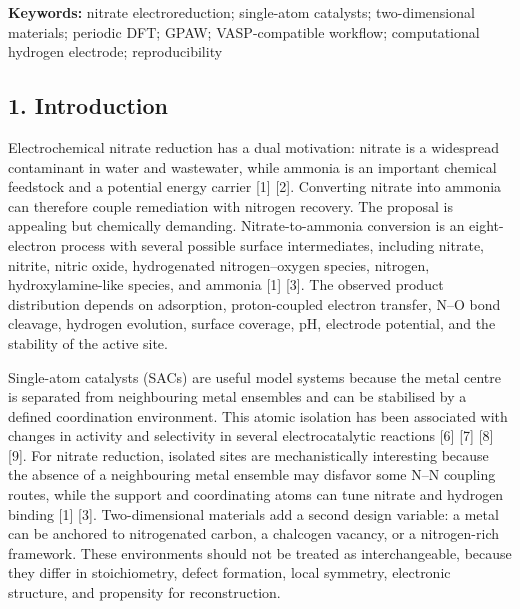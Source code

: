 \documentclass[
]{article}
\begin{document}
\textbf{Keywords:} nitrate electroreduction; single-atom catalysts;
two-dimensional materials; periodic DFT; GPAW; VASP-compatible workflow;
computational hydrogen electrode; reproducibility

\hypertarget{introduction}{%
\subsection{1. Introduction}\label{introduction}}

Electrochemical nitrate reduction has a dual motivation: nitrate is a
widespread contaminant in water and wastewater, while ammonia is an
important chemical feedstock and a potential energy carrier {[}1{]}
{[}2{]}. Converting nitrate into ammonia can therefore couple
remediation with nitrogen recovery. The proposal is appealing but
chemically demanding. Nitrate-to-ammonia conversion is an eight-electron
process with several possible surface intermediates, including nitrate,
nitrite, nitric oxide, hydrogenated nitrogen--oxygen species, nitrogen,
hydroxylamine-like species, and ammonia {[}1{]} {[}3{]}. The observed
product distribution depends on adsorption, proton-coupled electron
transfer, N--O bond cleavage, hydrogen evolution, surface coverage, pH,
electrode potential, and the stability of the active site.

Single-atom catalysts (SACs) are useful model systems because the metal
centre is separated from neighbouring metal ensembles and can be
stabilised by a defined coordination environment. This atomic isolation
has been associated with changes in activity and selectivity in several
electrocatalytic reactions {[}6{]} {[}7{]} {[}8{]} {[}9{]}. For nitrate
reduction, isolated sites are mechanistically interesting because the
absence of a neighbouring metal ensemble may disfavor some N--N coupling
routes, while the support and coordinating atoms can tune nitrate and
hydrogen binding {[}1{]} {[}3{]}. Two-dimensional materials add a second
design variable: a metal can be anchored to nitrogenated carbon, a
chalcogen vacancy, or a nitrogen-rich framework. These environments
should not be treated as interchangeable, because they differ in
stoichiometry, defect formation, local symmetry, electronic structure,
and propensity for reconstruction.
\end{document}
